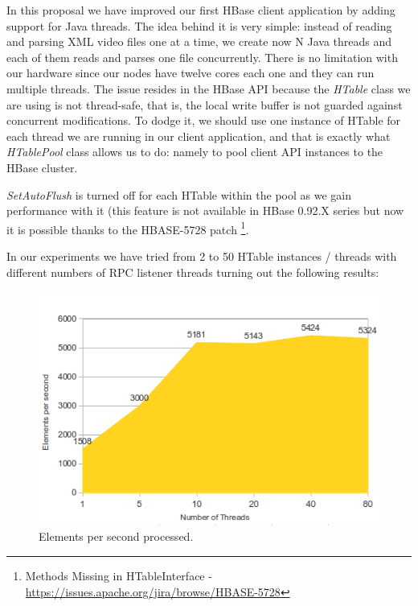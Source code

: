 In this proposal we have improved our first HBase client application by adding support for Java threads. The idea behind it is very simple: instead of reading and parsing XML video files one at a time, we create now N Java threads and each of them reads and parses one file concurrently. There is no limitation with our hardware since our nodes have twelve cores each one and they can run multiple threads. The issue resides in the HBase API because the \textit{HTable} class we are using is not thread-safe, that is, the local write buffer is not guarded against concurrent modifications. To dodge it, we should use one instance of HTable for each thread we are running in our client application, and that is exactly what \textit{HTablePool} class allows us to do: namely to pool client API instances to the HBase cluster.
\par
\textit{SetAutoFlush} is turned off for each HTable within the pool as we gain performance with it (this feature is not available in HBase 0.92.X series but now it is possible thanks to the HBASE-5728 patch \footnote{Methods {M}issing in {HT}able{I}nterface - \url{https://issues.apache.org/jira/browse/HBASE-5728}}. 
\par
 In our experiments we have tried from 2 to 50 HTable instances / threads with different numbers of RPC listener threads turning out the following results:


\begin{figure}[htb]
\centering
\includegraphics[width=1\textwidth]{./images/threadsworking.png}
\caption{Elements per second processed.} \label{fig:threadsworking}
\end{figure}




